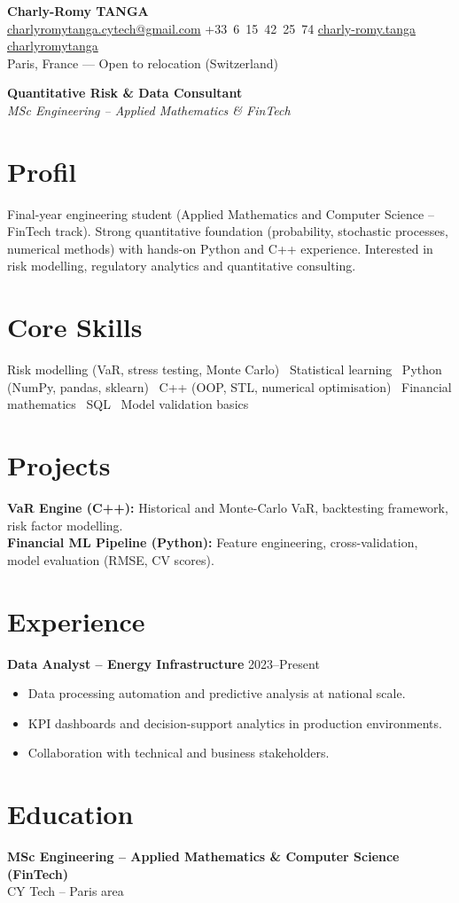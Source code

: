 \documentclass[10pt, letterpaper]{article}
\begin{document}
\begin{center}
\textbf{\LARGE Charly-Romy TANGA}\\[0.15cm]
\mbox{\href{mailto:charlyromytanga.cytech@gmail.com}{\footnotesize\faEnvelope\hspace*{0.1cm}charlyromytanga.cytech@gmail.com}}\kern0.25cm
\mbox{\faPhone\hspace*{0.1cm}+33 6 15 42 25 74}\kern0.25cm
\mbox{\href{https://www.linkedin.com/in/charly-romy-tanga}{\footnotesize\faLinkedin\hspace*{0.1cm}charly-romy.tanga}}\kern0.25cm
\mbox{\href{https://github.com/charlyromytanga}{\footnotesize\faGithub\hspace*{0.1cm}charlyromytanga}}\\[0.15cm]
Paris, France --- Open to relocation (Switzerland)
\end{center}
\textbf{Quantitative Risk \& Data Consultant}\\
\textit{MSc Engineering -- Applied Mathematics \& FinTech}
\section*{Profil}
Final-year engineering student (Applied Mathematics and Computer Science -- FinTech track). Strong quantitative foundation (probability, stochastic processes, numerical methods) with hands-on Python and C++ experience. Interested in risk modelling, regulatory analytics and quantitative consulting.
\section*{Core Skills}
Risk modelling (VaR, stress testing, Monte Carlo) \textbullet\ Statistical learning \textbullet\ Python (NumPy, pandas, sklearn) \textbullet\ C++ (OOP, STL, numerical optimisation) \textbullet\ Financial mathematics \textbullet\ SQL \textbullet\ Model validation basics
\section*{Projects}
\textbf{VaR Engine (C++):} Historical and Monte-Carlo VaR, backtesting framework, risk factor modelling.\\
\textbf{Financial ML Pipeline (Python):} Feature engineering, cross-validation, model evaluation (RMSE, CV scores).
\section*{Experience}
\textbf{Data Analyst -- Energy Infrastructure} \hfill 2023--Present
\begin{itemize}[leftmargin=0.45cm,itemsep=1pt,topsep=2pt]
\item Data processing automation and predictive analysis at national scale.
\item KPI dashboards and decision-support analytics in production environments.
\item Collaboration with technical and business stakeholders.
\end{itemize}
\section*{Education}
\textbf{MSc Engineering -- Applied Mathematics \& Computer Science (FinTech)}\\CY Tech -- Paris area
\end{document}

